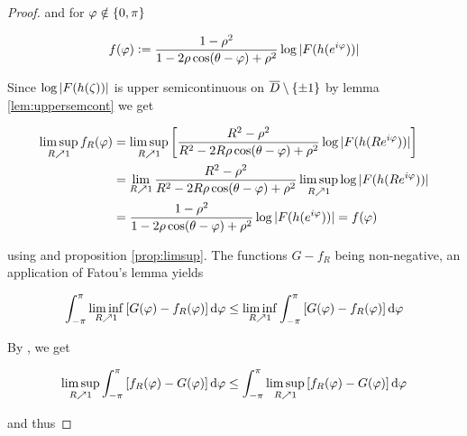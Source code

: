 \begin{proof}
\noindent and for $\varphi \notin \cbr[0]{ 0,\pi}$

\begin{equation*}
	f(\varphi) := \frac{1 - \rho^2}{1 - 2\rho\cos(\theta - \varphi) + \rho^2}\log\abs[0]{ F(h(e^{i\varphi}))}
\end{equation*}

Since $\log\abs[0]{ F(h(\zeta))}$ is upper semicontinuous on $\overline{D} \setminus \cbr[0]{ \pm 1}$ by lemma \ref{lem:uppersemcont} we get

\begin{equation*}
	\begin{aligned}
		\limsup_{R \nearrow 1}f_R(\varphi) &= \limsup_{R \nearrow 1} \sbr[3]{ \frac{R^2 - \rho^2}{R^2 - 2R\rho\cos(\theta - \varphi) + \rho^2}\log\abs[0]{ F(h(Re^{i\varphi}))}}\\
		&= \lim_{R \nearrow 1} \frac{R^2 - \rho^2}{R^2 - 2R\rho\cos(\theta - \varphi) + \rho^2}\limsup_{R \nearrow 1} \log\abs[0]{ F(h(Re^{i\varphi}))}\\
		&= \frac{1 - \rho^2}{1 - 2\rho\cos(\theta - \varphi) + \rho^2}\log\abs[0]{ F(h(e^{i\varphi}))} = f(\varphi)
	\end{aligned}
\end{equation*}

\noindent using \cite[363]{bourbaki:general_topology:1995} and proposition \ref{prop:limsup}. The functions $G - f_R$ being non-negative, an application of Fatou's lemma yields

\begin{equation*}
	\int_{-\pi}^\pi \liminf_{R \nearrow 1}\sbr[0]{ G(\varphi) - f_R(\varphi)}\d\varphi \leq \liminf_{R \nearrow 1} \int_{-\pi}^\pi \sbr[0]{ G(\varphi) - f_R(\varphi)}\d\varphi
\end{equation*}

By \cite[354]{bourbaki:general_topology:1995}, we get

\begin{equation*}
	\limsup_{R \nearrow 1} \int_{-\pi}^\pi \sbr[0]{ f_R(\varphi) - G(\varphi)}\d \varphi \leq \int_{-\pi}^\pi \limsup_{R \nearrow 1}\sbr[0]{ f_R(\varphi) - G(\varphi)}\d\varphi
\end{equation*}

\noindent and thus


\end{proof}
